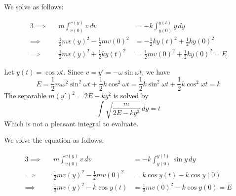 \documentclass[a4paper]{article}
\begin{document}
We solve as follows:

\begin{alignat*}{3}
	\implies && m\int^{v \!\left( y \right) }_{v \!\left( 0 \right) } v \, dv & = -k \int^{y \!\left( t \right) }_{y \!\left( 0 \right) }  y \, dy   \\
	\implies && \frac{1}{2}mv \!\left( y \right) ^{2} - \frac{1}{2}mv \!\left( 0 \right)^{2} & = -\frac{1}{2}ky \!\left( t \right) ^{2} + \frac{1}{2}k y \!\left( 0 \right)^{2} \\
	\implies && \frac{1}{2} mv \!\left( y \right)^{2} + \frac{1}{2} k y \!\left( t \right)^{2} & = \frac{1}{2}m v \!\left( 0 \right)^{2} + \frac{1}{2} k y \!\left( 0 \right)^{2} = E
\end{alignat*}

Let \(y \!\left( t \right) = \cos \omega t\). Since \(v = y' = -\omega \sin \omega t\), we have
\[
	E = \frac{1}{2}m \omega^{2} \sin^{2} \omega t + \frac{1}{2} k \cos^{2} \omega t = \frac{1}{2} k \sin^{2} \omega t + \frac{1}{2} k \cos^{2} \omega t = k
\]
The separable \(m \!\left( y' \right)^{2} = 2E - ky^{2}\) is solved by
\[
	\int \sqrt{\frac{m}{2E - ky^{2}}} \, dy = t
\]
Which is not a pleasant integral to evaluate.

\vspace{12pt}


We solve the equation as follows:

\begin{alignat*}{3}
	\implies && m \int^{v \!\left( y \right) }_{v \!\left( 0 \right) } v \, dv   & = -k \int^{y \!\left( t \right) }_{y \!\left( 0 \right) } \sin y \, dy  \\
	\implies && \frac{1}{2}m v \!\left( y \right)^{2} - \frac{1}{2}m v \!\left( 0 \right)^{2} & = k \cos y \!\left( t \right) - k \cos y \!\left( 0 \right)  \\
	\implies && \frac{1}{2}m v \!\left( y \right)^{2} - k \cos y \!\left( t \right) & = \frac{1}{2}m v \!\left( 0 \right)^{2} - k \cos y \!\left( 0 \right) = E 
\end{alignat*}
\end{document}
